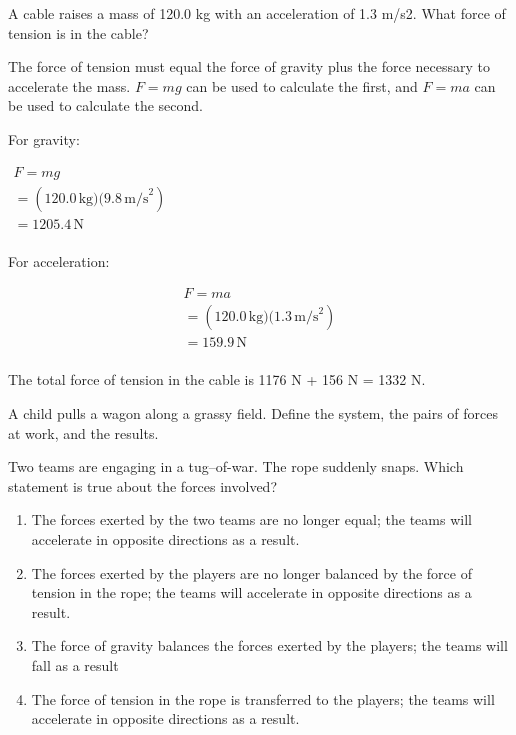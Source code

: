 \documentclass[
]{book}
\providecommand{\tightlist}{%
  \setlength{\itemsep}{0pt}\setlength{\parskip}{0pt}}
\begin{document}
\hypertarget{fs-id1458737}{}
\leavevmode{}%
A cable raises a mass of 120.0 kg with an acceleration of 1.3 m/s2. What
force of tension is in the cable?

\leavevmode{}%
The force of tension must equal the force of gravity plus the force
necessary to accelerate the mass. \(F = mg\) can be used to calculate the
first, and \(F = ma\) can be used to calculate the second.

For gravity:

\(\begin{array}{l} {F = mg} \\ {= (120.0\,\text{kg)(9}\text{.8}\,\text{m/s}^{\text{2}})} \\ {= 1205.4\,\text{N}} \\ \end{array}\)

For acceleration:

\[\begin{array}{l}
{F = ma} \\
{= (120.0\,\text{kg)(1}\text{.3}\,\text{m/s}^{\text{2}})} \\
{= 159.9\,\text{N}} \\
\end{array}\]

The total force of tension in the cable is 1176 N + 156 N = 1332 N.

\hypertarget{fs-id1591869}{}
\leavevmode{}%
A child pulls a wagon along a grassy field. Define the system, the pairs
of forces at work, and the results.

\hypertarget{fs-id1349141}{}
\leavevmode{}%
Two teams are engaging in a tug--of-war. The rope suddenly snaps. Which
statement is true about the forces involved?

\begin{enumerate}
\def\labelenumi{\alph{enumi}.}
\tightlist
\item
  The forces exerted by the two teams are no longer equal; the teams
  will accelerate in opposite directions as a result.
\item
  The forces exerted by the players are no longer balanced by the
  force of tension in the rope; the teams will accelerate in opposite
  directions as a result.
\item
  The force of gravity balances the forces exerted by the players; the
  teams will fall as a result
\item
  The force of tension in the rope is transferred to the players; the
  teams will accelerate in opposite directions as a result.
\end{enumerate}
\end{document}
